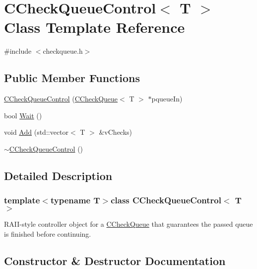 \hypertarget{class_c_check_queue_control}{}\section{C\+Check\+Queue\+Control$<$ T $>$ Class Template Reference}
\label{class_c_check_queue_control}


{\ttfamily \#include $<$checkqueue.\+h$>$}

\subsection*{Public Member Functions}
\begin{DoxyCompactItemize}
\item 
\hyperlink{class_c_check_queue_control_ae690afca20574a7c98e0c5e82011c606}{C\+Check\+Queue\+Control} (\hyperlink{class_c_check_queue}{C\+Check\+Queue}$<$ T $>$ $\ast$pqueue\+In)
\item 
bool \hyperlink{class_c_check_queue_control_ab31d809a76b876d21608c0c5d0e3baf0}{Wait} ()
\item 
void \hyperlink{class_c_check_queue_control_aa11e8248c91b0758b39132db4090ff8d}{Add} (std\+::vector$<$ T $>$ \&v\+Checks)
\item 
\hyperlink{class_c_check_queue_control_afc8a9f044b4559a04ff3569cff5d2f94}{$\sim$\+C\+Check\+Queue\+Control} ()
\end{DoxyCompactItemize}


\subsection{Detailed Description}
\subsubsection*{template$<$typename T$>$class C\+Check\+Queue\+Control$<$ T $>$}

R\+A\+I\+I-\/style controller object for a \hyperlink{class_c_check_queue}{C\+Check\+Queue} that guarantees the passed queue is finished before continuing. 

\subsection{Constructor \& Destructor Documentation}
\hypertarget{class_c_check_queue_control_ae690afca20574a7c98e0c5e82011c606}{}
